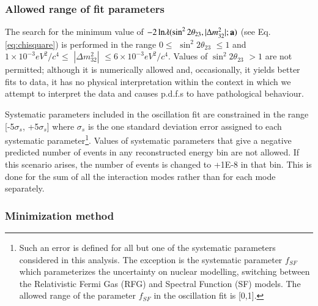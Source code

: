 \subsubsection {Allowed range of fit parameters}
\label{sec:oscfit_method_param_range}

The search for the minimum value of 
$-2 \, \textrm{ln} \lambda(\sin^{2}2\theta_{23},|\Delta m^ {2}_{32}|; {\bf a})$ (see Eq. \ref{eq:chisquare}) 
is performed in the range 
$0 \leq$ $\sin^{2}2\theta_{23}$ $\leq 1$ and
$1 \times 10^{-3} eV^{2}/c^{4} \leq$ $|\Delta m^{2}_{32}|$ $\leq 6 \times 10^{-3} eV^{2}/c^{4}$.
Values of $\sin^{2}2\theta_{23}$ $> 1$  are not permitted; although it is numerically allowed and,
occasionally, it yields better fits to data, it has no physical interpretation within the context
in which we attempt to interpret the data and causes p.d.f.s to have pathological behaviour.

Systematic parameters included in the oscillation fit are constrained in the range [-5$\sigma_{s}$, +5$\sigma_{s}$]
where $\sigma_{s}$ is the one standard deviation error assigned to each systematic parameter\footnote{
 Such an error is defined for all but one of the systematic parameters considered in this analysis. 
 The exception is the systematic parameter $f_{SF}$ which parameterizes the uncertainty on nuclear modelling, 
 switching between the Relativistic Fermi Gas (RFG) and Spectral Function (SF) models. The allowed range of the parameter $f_{SF}$ 
in the oscillation fit is [0,1].}.
Values of systematic parameters that give a negative predicted number of events in any reconstructed energy bin are not allowed. 
If this scenario arises, the number of events is changed to +1E-8 in that bin. This is done for the sum of all the interaction 
modes rather than for each mode separately.

\subsubsection {Minimization method}
\label{sec:oscfit_method_chisq}

